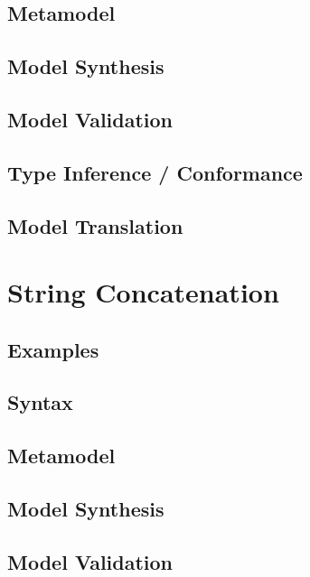 \documentclass[a4paper,oneside,12pt, extrafontsizes]{memoir}
\begin{document}
    \section{Metamodel}

    \section{Model Synthesis}

    \section{Model Validation}

    \section{Type Inference / Conformance}

    \section{Model Translation}

  \chapter{String Concatenation}
  \label{ch:string-concatenation}
  

    \section{Examples}
    

    \section{Syntax}
    

    \section{Metamodel}

    \section{Model Synthesis}

    \section{Model Validation}
    
\end{document}
